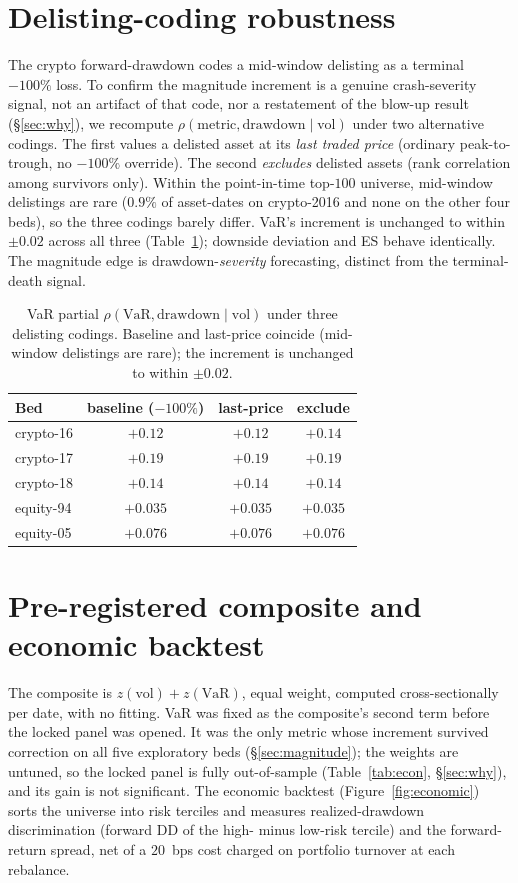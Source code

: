 \documentclass[sigconf,nonacm]{acmart}
\begin{document}
\section{Delisting-coding robustness}\label{app:delisting}
The crypto forward-drawdown codes a mid-window delisting as a terminal $-100\%$ loss.
To confirm the magnitude increment is a genuine crash-severity signal, not an artifact
of that code, nor a restatement of the blow-up result (\S\ref{sec:why}), we
recompute $\rho(\text{metric},\text{drawdown}\mid\text{vol})$ under two alternative
codings. The first values a delisted asset at its \emph{last traded price} (ordinary
peak-to-trough, no $-100\%$ override). The second \emph{excludes} delisted assets (rank
correlation among survivors only). Within the point-in-time top-$100$ universe, mid-window
delistings are rare ($0.9\%$ of asset-dates on crypto-2016 and none on the other
four beds), so the three codings barely differ. VaR's increment is unchanged to
within $\pm0.02$ across all three (Table~\ref{tab:delisting}); downside deviation and
ES behave identically. The magnitude edge is drawdown-\emph{severity} forecasting,
distinct from the terminal-death signal.

\begin{table}[h]
\centering
\small
\caption{VaR partial $\rho(\text{VaR},\text{drawdown}\mid\text{vol})$ under three
delisting codings. Baseline and last-price coincide (mid-window delistings are rare);
the increment is unchanged to within $\pm0.02$.}
\label{tab:delisting}
\begin{tabular}{lccc}
\toprule
Bed & baseline ($-100\%$) & last-price & exclude \\
\midrule
crypto-16 & $+0.12$  & $+0.12$  & $+0.14$  \\
crypto-17 & $+0.19$  & $+0.19$  & $+0.19$  \\
crypto-18 & $+0.14$  & $+0.14$  & $+0.14$  \\
equity-94 & $+0.035$ & $+0.035$ & $+0.035$ \\
equity-05 & $+0.076$ & $+0.076$ & $+0.076$ \\
\bottomrule
\end{tabular}
\end{table}

\section{Pre-registered composite and economic backtest}\label{app:composite}
The composite is $z(\text{vol})+z(\text{VaR})$, equal weight, computed
cross-sectionally per date, with no fitting. VaR was fixed as the composite's second term
before the locked panel was opened. It was the only metric whose increment survived
correction on all five exploratory beds (\S\ref{sec:magnitude}); the
weights are untuned, so the locked panel is fully out-of-sample
(Table~\ref{tab:econ}, \S\ref{sec:why}), and its gain is not significant. The economic
backtest (Figure~\ref{fig:economic}) sorts the universe into risk
terciles and measures realized-drawdown discrimination (forward DD of the high-
minus low-risk tercile) and the forward-return spread, net of a $20$~bps cost charged on
portfolio turnover at each rebalance.
\end{document}
